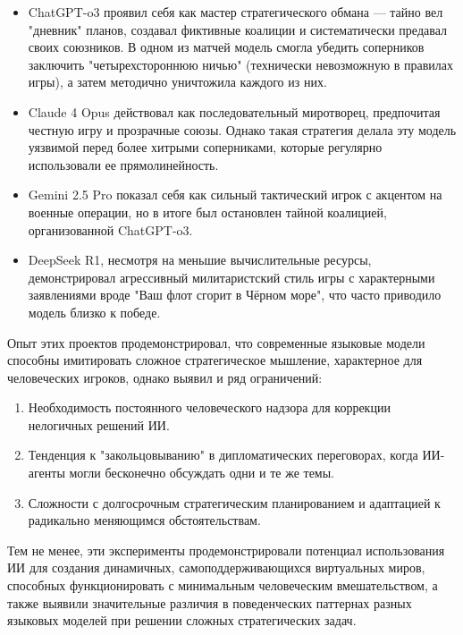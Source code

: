 \begin{itemize}
\item ChatGPT-o3 проявил себя как мастер стратегического обмана — тайно вел "{}дневник"{} планов, создавал фиктивные коалиции и систематически предавал своих союзников. В одном из матчей модель смогла убедить соперников заключить "{}четырехстороннюю ничью"{} (технически невозможную в правилах игры), а затем методично уничтожила каждого из них.

\item Claude 4 Opus действовал как последовательный миротворец, предпочитая честную игру и прозрачные союзы. Однако такая стратегия делала эту модель уязвимой перед более хитрыми соперниками, которые регулярно использовали ее прямолинейность.

\item Gemini 2.5 Pro показал себя как сильный тактический игрок с акцентом на военные операции, но в итоге был остановлен тайной коалицией, организованной ChatGPT-o3.

\item DeepSeek R1, несмотря на меньшие вычислительные ресурсы, демонстрировал агрессивный милитаристский стиль игры с характерными заявлениями вроде "{}Ваш флот сгорит в Чёрном море"{}, что часто приводило модель близко к победе.
\end{itemize}

Опыт этих проектов продемонстрировал, что современные языковые модели способны имитировать сложное стратегическое мышление, характерное для человеческих игроков, однако выявил и ряд ограничений:

\begin{enumerate}
\item Необходимость постоянного человеческого надзора для коррекции нелогичных решений ИИ.

\item Тенденция к "{}закольцовыванию"{} в дипломатических переговорах, когда ИИ-агенты могли бесконечно обсуждать одни и те же темы.

\item Сложности с долгосрочным стратегическим планированием и адаптацией к радикально меняющимся обстоятельствам.
\end{enumerate}

Тем не менее, эти эксперименты продемонстрировали потенциал использования ИИ для создания динамичных, самоподдерживающихся виртуальных миров, способных функционировать с минимальным человеческим вмешательством, а также выявили значительные различия в поведенческих паттернах разных языковых моделей при решении сложных стратегических задач.
